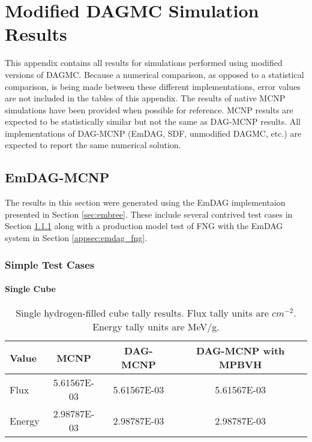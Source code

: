 
\chapter{Modified DAGMC Simulation Results}\label{ch:appendix-b}

This appendix contains all results for simulations performed using modified
versions of DAGMC. Because a numerical comparison, as opposed to a statistical
comparison, is being made between these different implementations, error values
are not included in the tables of this appendix. The results of native MCNP
simulations have been provided when possible for reference. MCNP results are
expected to be statistically similar but not the same as DAG-MCNP results. All
implementations of DAG-MCNP (EmDAG, SDF, unmodified DAGMC, etc.) are expected to
report the same numerical solution.

\section{EmDAG-MCNP}

The results in this section were generated using the EmDAG
implementaion presented in Section \ref{sec:embree}. These include several
contrived test cases in Section \ref{appsec:emdag_simple_tests} along with a
production model test of FNG with the EmDAG system in Section \ref{appsec:emdag_fng}.

\subsection{Simple Test Cases}\label{appsec:emdag_simple_tests}
  \subsubsection{Single Cube}

  \begin{table}[H]
    \small
    \begin{center}
      \begin{tabular}{lccc}
        \toprule
        Value & MCNP & DAG-MCNP & DAG-MCNP with MPBVH \\
        \toprule
        \hline
        Flux   & 5.61567E-03 & 5.61567E-03 & 5.61567E-03 \\
        Energy & 2.98787E-03 & 2.98787E-03 & 2.98787E-03 \\
        \bottomrule
      \end{tabular}
      \caption[Single hydrogen-filled cube tally results.]{Single
        hydrogen-filled cube tally results. Flux tally units are
        $cm^{-2}$. Energy tally units are MeV/g.}
      \label{nestedspheres}
    \end{center}
  \end{table}


